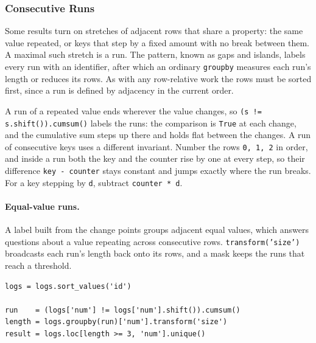 \subsubsection{Consecutive Runs}

Some results turn on stretches of adjacent rows that share a property: the same value repeated, or keys that step by a fixed amount with no break between them. A maximal such stretch is a run. The pattern, known as gaps and islands, labels every run with an identifier, after which an ordinary \texttt{groupby} measures each run's length or reduces its rows. As with any row-relative work the rows must be sorted first, since a run is defined by adjacency in the current order.

\vspace{1ex}

\begin{keybox}
A run of a repeated value ends wherever the value changes, so \texttt{(s != s.shift()).cumsum()} labels the runs: the comparison is \texttt{True} at each change, and the cumulative sum steps up there and holds flat between the changes. A run of consecutive keys uses a different invariant. Number the rows \texttt{0, 1, 2} in order, and inside a run both the key and the counter rise by one at every step, so their difference \texttt{key - counter} stays constant and jumps exactly where the run breaks. For a key stepping by \texttt{d}, subtract \texttt{counter * d}.
\end{keybox}

\paragraph{Equal-value runs.} A label built from the change points groups adjacent equal values, which answers questions about a value repeating across consecutive rows. \texttt{transform('size')} broadcasts each run's length back onto its rows, and a mask keeps the runs that reach a threshold.

\begin{lstlisting}[style=python, caption={Numbers appearing on three or more consecutive rows}]
logs = logs.sort_values('id')

run    = (logs['num'] != logs['num'].shift()).cumsum()
length = logs.groupby(run)['num'].transform('size')
result = logs.loc[length >= 3, 'num'].unique()
\end{lstlisting}

